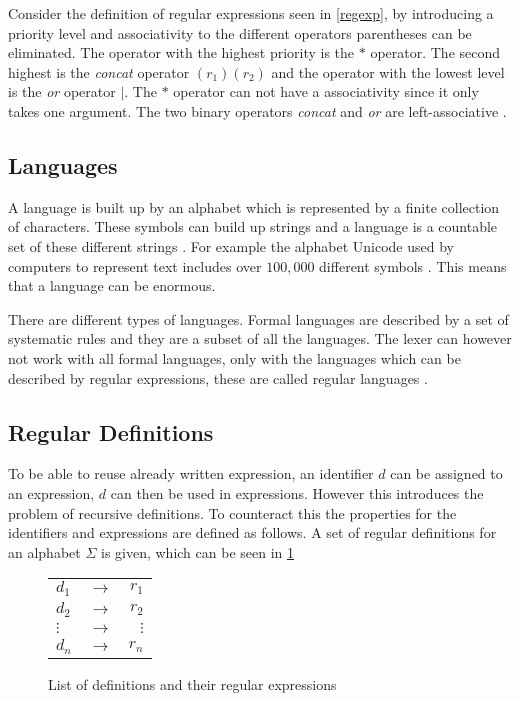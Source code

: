 Consider the definition of regular expressions seen in \cref{regexp},
by introducing a priority level and associativity to the different operators
parentheses can be eliminated. The operator with the highest priority is the $*$
operator. The second highest is the \emph{concat} operator $(r_1)(r_2)$ and the
operator with the lowest level is the \emph{or} operator $|$. The $*$ operator
can not have a associativity since it only takes one argument. The two
binary operators \emph{concat} and \emph{or} are left-associative
\cite{Aho1990}.

\subsection{Languages}
A language is built up by an alphabet which is represented by a finite
collection of characters. These symbols can build up strings and a language is
a countable set of these different strings \cite{Aho2006}. For example the
alphabet Unicode used by computers to represent text includes over $100,000$
different symbols \cite{Aho2006}. This means that a language can be enormous.

There are different types of languages. Formal languages are described by a set
of systematic rules and they are a subset of all the languages. The lexer can
however not work with all formal languages, only
with the languages which can be described by regular expressions, these are
called regular languages \cite{Ranta2012}.

\subsection{Regular Definitions}
To be able to reuse already written expression, an identifier $d$ can be
assigned to an expression, $d$ can then be used in expressions. However
this introduces the problem of recursive definitions. To counteract this
the properties for the identifiers and expressions are defined as follows.
\newpage
A set of regular definitions for an alphabet $\Sigma$ is given, which can be
seen in \cref{fig:regularDefinitions}

\begin{figure}[ht!]
\begin{center}
\begin{tabular}{l c r}
$d_1$ & $\to$ & $r_1$\\
$d_2$ & $\to$ & $r_2$\\
$\vdots$ & $\to$ & $\vdots$\\
$d_n$ & $\to$ & $r_n$\\
\end{tabular}
\caption{List of definitions and their regular expressions \label{fig:regularDefinitions}}
\end{center}
\end{figure}

